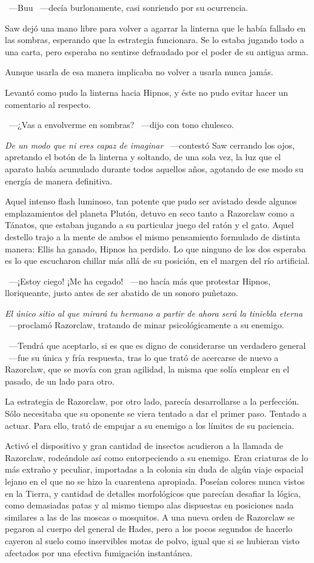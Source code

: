 ~---Buu ~---decía burlonamente, casi sonriendo por su ocurrencia.

Saw dejó una mano libre para volver a agarrar la linterna que le había fallado en las sombras, esperando que la estrategia funcionara. Se lo estaba jugando todo a una carta, pero esperaba no sentirse defraudado por el poder de su antigua arma.

Aunque usarla de esa manera implicaba no volver a usarla nunca jamás.

Levantó como pudo la linterna hacia Hipnos, y éste no pudo evitar hacer un comentario al respecto.

~---¿Vas a envolverme en sombras? ~---dijo con tono chulesco.

\emph{De un modo que ni eres capaz de imaginar} ~---contestó Saw cerrando los ojos, apretando el botón de la linterna y soltando, de una sola vez, la luz que el aparato había acumulado durante todos aquellos años, agotando de ese modo su energía de manera definitiva.

Aquel intenso flash luminoso, tan potente que pudo ser avistado desde algunos emplazamientos del planeta Plutón, detuvo en seco tanto a Razorclaw como a Tánatos, que estaban jugando a su particular juego del ratón y el gato. Aquel destello trajo a la mente de ambos el mismo pensamiento formulado de distinta manera: Ellis ha ganado, Hipnos ha perdido. Lo que ninguno de los dos esperaba es lo que escucharon chillar más allá de su posición, en el margen del río artificial.

~---¡Estoy ciego! ¡Me ha cegado! ~---no hacía más que protestar Hipnos, lloriqueante, justo antes de ser abatido de un sonoro puñetazo.

\emph{El único sitio al que mirará tu hermano a partir de ahora será la tiniebla eterna} ~---proclamó Razorclaw, tratando de minar psicológicamente a su enemigo.

~---Tendrá que aceptarlo, si es que es digno de considerarse un verdadero general ~---fue su única y fría respuesta, tras lo que trató de acercarse de nuevo a Razorclaw, que se movía con gran agilidad, la misma que solía emplear en el pasado, de un lado para otro.

La estrategia de Razorclaw, por otro lado, parecía desarrollarse a la perfección. Sólo necesitaba que su oponente se viera tentado a dar el primer paso. Tentado a actuar. Para ello, trató de empujar a su enemigo a los límites de su paciencia.

Activó el dispositivo y gran cantidad de insectos acudieron a la llamada de Razorclaw, rodeándole así como entorpeciendo a su enemigo. Eran criaturas de lo más extraño y peculiar, importadas a la colonia sin duda de algún viaje espacial lejano en el que no se hizo la cuarentena apropiada. Poseían colores nunca vistos en la Tierra, y cantidad de detalles morfológicos que parecían desafiar la lógica, como demasiadas patas y al mismo tiempo alas dispuestas en posiciones nada similares a las de las moscas o mosquitos. A una nueva orden de Razorclaw se pegaron al cuerpo del general de Hades, pero a los pocos segundos de hacerlo cayeron al suelo como inservibles motas de polvo, igual que si se hubieran visto afectados por una efectiva fumigación instantánea.

